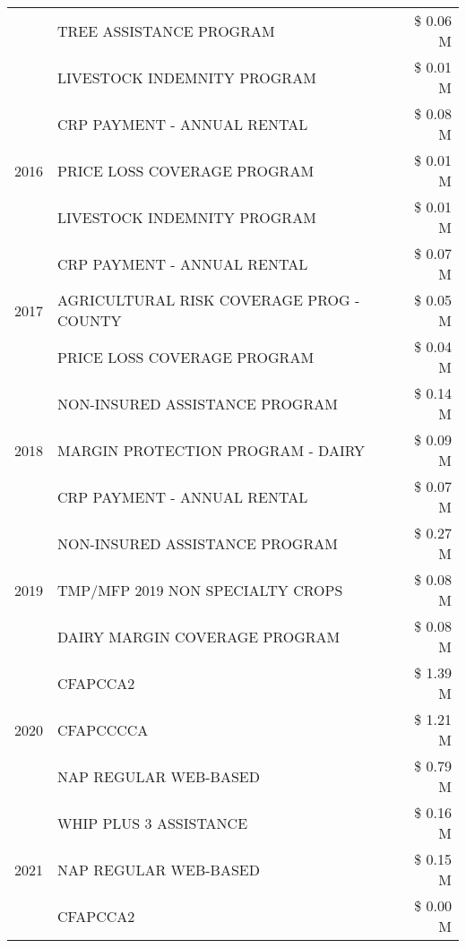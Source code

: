 \begin{tabular}{llr}
 & TREE ASSISTANCE PROGRAM & \$ 0.06 M \\
 & LIVESTOCK INDEMNITY PROGRAM & \$ 0.01 M \\
\cline{1-3}
\multirow[t]{3}{*}{2016} & CRP PAYMENT - ANNUAL RENTAL & \$ 0.08 M \\
 & PRICE LOSS COVERAGE PROGRAM & \$ 0.01 M \\
 & LIVESTOCK INDEMNITY PROGRAM & \$ 0.01 M \\
\cline{1-3}
\multirow[t]{3}{*}{2017} & CRP PAYMENT - ANNUAL RENTAL & \$ 0.07 M \\
 & AGRICULTURAL RISK COVERAGE PROG - COUNTY & \$ 0.05 M \\
 & PRICE LOSS COVERAGE PROGRAM & \$ 0.04 M \\
\cline{1-3}
\multirow[t]{3}{*}{2018} & NON-INSURED ASSISTANCE PROGRAM & \$ 0.14 M \\
 & MARGIN PROTECTION PROGRAM - DAIRY & \$ 0.09 M \\
 & CRP PAYMENT - ANNUAL RENTAL & \$ 0.07 M \\
\cline{1-3}
\multirow[t]{3}{*}{2019} & NON-INSURED ASSISTANCE PROGRAM & \$ 0.27 M \\
 & TMP/MFP 2019 NON SPECIALTY CROPS & \$ 0.08 M \\
 & DAIRY MARGIN COVERAGE PROGRAM & \$ 0.08 M \\
\cline{1-3}
\multirow[t]{3}{*}{2020} & CFAPCCA2 & \$ 1.39 M \\
 & CFAPCCCCA & \$ 1.21 M \\
 & NAP REGULAR WEB-BASED & \$ 0.79 M \\
\cline{1-3}
\multirow[t]{3}{*}{2021} & WHIP PLUS 3 ASSISTANCE & \$ 0.16 M \\
 & NAP REGULAR WEB-BASED & \$ 0.15 M \\
 & CFAPCCA2 & \$ 0.00 M \\
\cline{1-3}
\bottomrule
\end{tabular}
